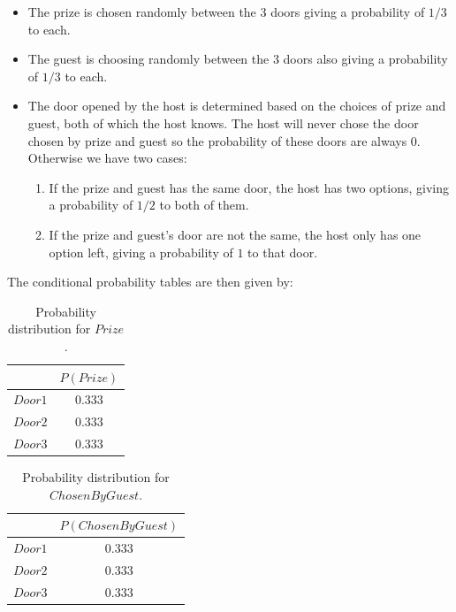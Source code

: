 \documentclass[10pt, a4paper, english]{../Template/NTNUoving}
\begin{document}
\begin{oppgave}
\begin{punkt}
        \begin{itemize}
            \item The prize is chosen randomly between the 3 doors giving a probability of $1/3$ to each.
            \item The guest is choosing randomly between the 3 doors also giving a probability of $1/3$ to each.
            \item The door opened by the host is determined based on the choices of prize and guest, both of which the host knows. The host will never chose
            the door chosen by prize and guest so the probability of these doors are always 0. Otherwise we have two cases:
            \begin{enumerate}
                \item If the prize and guest has the same door, the host has two options, giving a probability of $1/2$ to both of them.
                \item If the prize and guest's door are not the same, the host only has one option left, giving a probability of $1$ to that door.
            \end{enumerate}
        \end{itemize}
        The conditional probability tables are then given by:
        \begin{table}[H]
            \centering
            \begin{tabular}{|c|c|}
                \hline
                & $P(Prize)$ \\ [0.5ex]
                \hline
                $Door1$ & 0.333 \\ [1.0ex]
                $Door2$ & 0.333 \\ [1.0ex]
                $Door3$ & 0.333 \\ [1.0ex]
                \hline
            \end{tabular}
            \caption{Probability distribution for $Prize$.}
        \end{table}

        \begin{table}[H]
            \centering
            \begin{tabular}{|c|c|}
                \hline
                & $P(ChosenByGuest)$ \\ [0.5ex]
                \hline
                $Door1$ & 0.333 \\ [1.0ex]
                $Door2$ & 0.333 \\ [1.0ex]
                $Door3$ & 0.333 \\ [1.0ex]
                \hline
            \end{tabular}
            \caption{Probability distribution for $ChosenByGuest$.}
        \end{table}


\end{punkt}
\end{oppgave}
\end{document}
